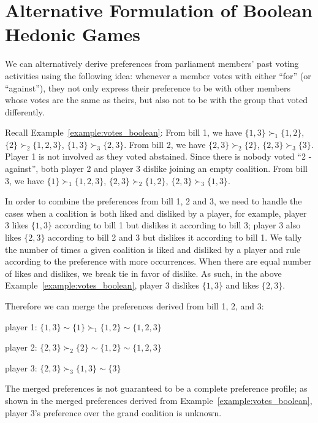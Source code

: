 
\chapter{Alternative Formulation of Boolean Hedonic Games}
\label{append:alternative_boolean}

We can alternatively derive preferences from parliament members' past voting
activities using the following idea:
whenever a member votes with either ``for'' (or ``against''), they not only
express their preference to be with other members whose votes are the same
as theirs, but also not to be with the group that voted differently.

Recall Example~\ref{example:votes_boolean}:
From bill 1, we have $\{1, 3\} \succ_1 \{1, 2\}$, $\{2\} \succ_2 \{1, 2, 3\}$,
$\{1, 3\} \succ_3 \{2, 3\}$.
From bill 2, we have $\{2, 3\} \succ_2 \{2\}$, $\{2, 3\} \succ_3 \{3\}$.
Player 1 is not involved as they voted abstained.
Since there is nobody voted ``2 - against'', both player 2 and player 3 dislike
joining an empty coalition.
From bill 3, we have $\{1\} \succ_1 \{1, 2, 3\}$, $\{2, 3\} \succ_2 \{1, 2\}$,
$\{2, 3\} \succ_3 \{1, 3\}$.

In order to combine the preferences from bill 1, 2 and 3, we need to handle
the cases when a coalition is both liked and disliked by a player, for example,
player 3 likes $\{1, 3\}$ according to bill 1 but dislikes it according to bill 3;
player 3 also likes $\{2, 3\}$ according to bill 2 and 3 but dislikes it
according to bill 1.
We tally the number of times a given coalition is liked and disliked by a
player and rule according to the preference with more occurrences.
When there are equal number of likes and dislikes, we break tie in favor of dislike.
As such, in the above Example~\ref{example:votes_boolean}, player 3 dislikes
$\{1, 3\}$ and likes $\{2, 3\}$.

Therefore we can merge the preferences derived from bill 1, 2, and 3:

player 1: $\{1, 3\} \sim \{1\} \succ_1 \{1, 2\} \sim \{1, 2, 3\}$

player 2: $\{2, 3\} \succ_2 \{2\} \sim \{1, 2\} \sim \{1, 2, 3\}$

player 3: $\{2, 3\} \succ_3 \{1, 3\} \sim \{3\}$

The merged preferences is not guaranteed to be a complete preference profile;
as shown in the merged preferences derived from Example~\ref{example:votes_boolean},
player 3's preference over the grand coalition is unknown.

